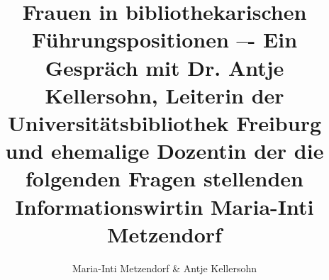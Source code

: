 
\fancyhead[R]{\thepage} %

\title{\LARGE{Frauen in bibliothekarischen Führungspositionen –- Ein Gespräch mit Dr. Antje Kellersohn, Leiterin der Universitätsbibliothek Freiburg und ehemalige Dozentin der die folgenden Fragen stellenden Informationswirtin Maria-Inti Metzendorf}} %
\author{Maria-Inti Metzendorf \& Antje Kellersohn} %

\setcounter{page}{82}
